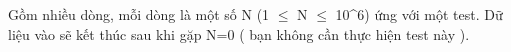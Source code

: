 Gồm nhiều dòng, mỗi dòng là một số N (1  $\le$  N  $\le$  10^6) ứng với một test. Dữ liệu vào sẽ kết thúc sau khi gặp N=0 ( bạn không cần thực hiện test này ).

\
